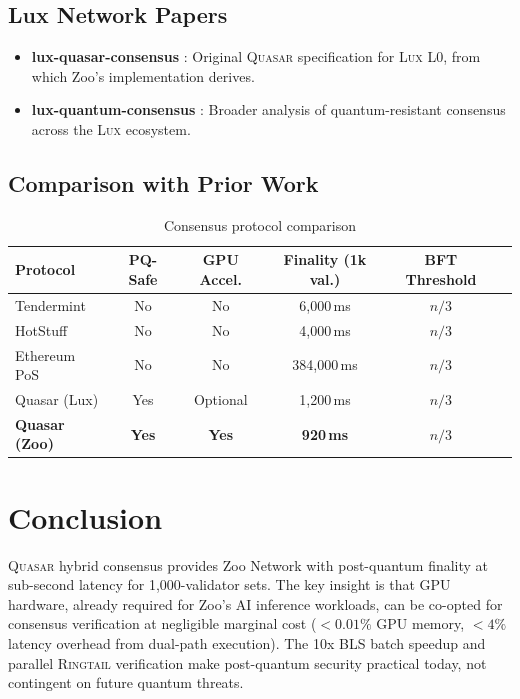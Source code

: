 \documentclass[11pt,letterpaper]{article}
\theoremstyle{definition}
\theoremstyle{remark}
\newcommand{\Lux}{\textsc{Lux}}
\newcommand{\Quasar}{\textsc{Quasar}}
\newcommand{\Ringtail}{\textsc{Ringtail}}
\begin{document}
\subsection{Lux Network Papers}

\begin{itemize}
\item \textbf{lux-quasar-consensus} \cite{lux-quasar-consensus}: Original \Quasar{} specification for \Lux{} L0, from which Zoo's implementation derives.
\item \textbf{lux-quantum-consensus} \cite{lux-quantum-consensus}: Broader analysis of quantum-resistant consensus across the \Lux{} ecosystem.
\end{itemize}

\subsection{Comparison with Prior Work}

\begin{table}[h]
\centering
\small
\begin{tabular}{lccccc}
\toprule
\textbf{Protocol} & \textbf{PQ-Safe} & \textbf{GPU Accel.} & \textbf{Finality (1k val.)} & \textbf{BFT Threshold} \\
\midrule
Tendermint & No & No & 6,000\,ms & $n/3$ \\
HotStuff & No & No & 4,000\,ms & $n/3$ \\
Ethereum PoS & No & No & 384,000\,ms & $n/3$ \\
Quasar (Lux) & Yes & Optional & 1,200\,ms & $n/3$ \\
\textbf{Quasar (Zoo)} & \textbf{Yes} & \textbf{Yes} & \textbf{920\,ms} & $n/3$ \\
\bottomrule
\end{tabular}
\caption{Consensus protocol comparison}
\label{tab:protocol-cmp}
\end{table}

\section{Conclusion}

\Quasar{} hybrid consensus provides Zoo Network with post-quantum finality at sub-second latency for 1,000-validator sets. The key insight is that GPU hardware, already required for Zoo's AI inference workloads, can be co-opted for consensus verification at negligible marginal cost ($< 0.01\%$ GPU memory, $< 4\%$ latency overhead from dual-path execution). The 10x BLS batch speedup and parallel \Ringtail{} verification make post-quantum security practical today, not contingent on future quantum threats.
\end{document}
